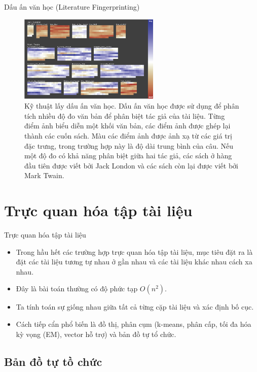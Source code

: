 \documentclass[10pt]{beamer}
\theoremstyle{remark}
\theoremstyle{definition}
\begin{document}
\begin{frame}{Dấu ấn văn học (Literature Fingerprinting)}
	\begin{figure}[h!]
        \centering
        \includegraphics[width=0.6\textwidth]{9.png}
        \caption{Kỹ thuật lấy dấu ấn văn học. Dấu ấn văn học được sử dụng để phân tích nhiều độ đo văn bản để phân biệt tác giả của tài liệu.
        Từng điểm ảnh biểu diễn một khối văn bản, các điểm ảnh được ghép lại thành các cuốn sách.
        Màu các điểm ảnh được ảnh xạ từ các giá trị đặc trưng, trong trường hợp này là độ dài trung bình của câu.
        Nếu một độ đo có khả năng phân biệt giữa hai tác giả, các sách ở hàng đầu tiên được viết bởi Jack London và các sách còn lại được viết bởi Mark Twain. \cite{222}}
        \label{fig:9}
    \end{figure}
\end{frame}


\section{Trực quan hóa tập tài liệu}

\begin{frame}{Trực quan hóa tập tài liệu}
	\begin{itemize}
		\item Trong hầu hết các trường hợp trực quan hóa tập tài liệu, mục tiêu đặt ra là đặt các tài liệu tương tự nhau ở gần nhau và các tài liệu khác nhau cách xa nhau.
		\item Đây là bài toán thường có độ phức tạp $O(n^2)$.
		\item Ta tính toán sự giống nhau giữa tất cả từng cặp tài liệu và xác định bố cục.
		\item Cách tiếp cẩn phổ biến là đồ thị, phân cụm (k-means, phân cấp, tối đa hóa kỳ vọng (EM), vector hỗ trợ) và bản đồ tự tổ chức.
	\end{itemize}
\end{frame}

\subsection{Bản đồ tự tồ chức}
\end{document}
